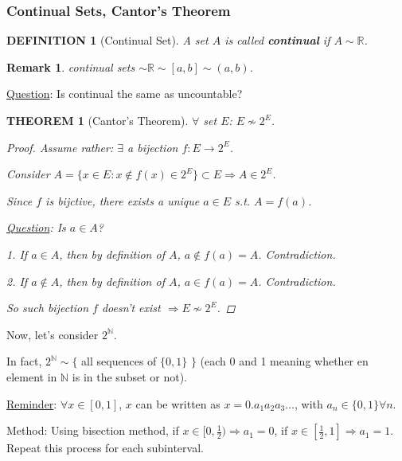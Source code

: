 \documentclass[12pt]{article}
\theoremstyle{blueplain}
\newtheorem{theorem}{THEOREM}[section]
\theoremstyle{bluedef}
\newtheorem{definition}{DEFINITION}[section]
\theoremstyle{blueremark}
\newtheorem{remark}{Remark}[section]
\newcommand{\R}{\mathbb{R}}
\newcommand{\N}{\mathbb{N}}
\numberwithin{equation}{section}
\begin{document}
\subsubsection{Continual Sets, Cantor's Theorem}

\begin{definition}[Continual Set]

  A set $A$ is called \textbf{continual} if $A \sim \R$.
\end{definition}

\begin{remark}
  continual sets $\sim \R \sim [a,b] \sim (a,b)$.
\end{remark}

\underline{Question}: Is continual the same as uncountable?

\begin{theorem}[Cantor's Theorem]

  $\forall$ set $E$: $E \not\sim 2^E$.
  \begin{proof}
    Assume rather: $\exists$ a bijection $f : E \rightarrow 2^E$.

    Consider $A = \{x \in E: x \notin f(x) \in 2^E\} \subset E \Rightarrow A \in 2^E$.

    Since $f$ is bijctive, there exists a unique $a \in E$ s.t. $A = f(a)$.

    \underline{Question}: Is $a \in A$?

    1. If $a \in A$, then by definition of $A$, $a \notin f(a) = A$. Contradiction.

    2. If $a \notin A$, then by definition of $A$, $a \in f(a) = A$. Contradiction.

    So such bijection $f$ doesn't exist $\Rightarrow E \not\sim 2^E$.
  \end{proof}
\end{theorem}

Now, let's consider $2^\N$.

In fact, $2^\N \sim \{$ all sequences of $\{0,1\}$ $\}$ (each 0 and 1 meaning whether en element in $\N$ is in the subset or not).

\underline{Reminder}: $\forall x \in [0,1]$, $x$ can be written as $x = 0. a_1 a_2 a_3 \dots$, with $a_n \in \{0,1\} \forall n$.

Method: Using bisection method, if $x \in [0, \frac{1}{2}) \Rightarrow a_1 =0$, if $x \in [\frac{1}{2}, 1] \Rightarrow a_1 = 1$. Repeat this process for each subinterval.
\end{document}

